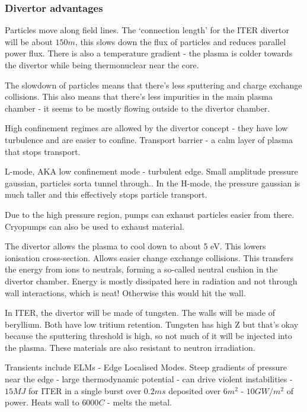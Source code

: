 \documentclass[PlasmaNotes.tex]{subfiles}
\begin{document}
\subsubsection{Divertor advantages}

Particles move along field lines. The `connection length' for the ITER divertor will be about $150m$, this slows down the flux of particles and reduces parallel power flux. There is also a temperature gradient - the plasma is colder towards the divertor while being thermonuclear near the core.

The slowdown of particles means that there's less sputtering and charge exchange collisions. This also means that there's less impurities in the main plasma chamber - it seems to be mostly flowing outside to the divertor chamber.

High confinement regimes are allowed by the divertor concept - they have low turbulence and are easier to confine. Transport barrier - a calm layer of plasma that stops transport.

L-mode, AKA low confinement mode - turbulent edge. Small amplitude pressure gaussian, particles sorta tunnel through.. In the H-mode, the pressure gaussian is much taller and this effectively stops particle transport.

Due to the high pressure region, pumps can exhaust particles easier from there. Cryopumps can also be used to exhaust material.


The divertor allows the plasma to cool down to about 5 eV. This lowers ionisation cross-section. Allows easier change exchange collisions. This transfers the energy from ions to neutrals, forming a so-called neutral cushion in the divertor chamber. Energy is mostly dissipated here in radiation and not through wall interactions, which is neat! Otherwise this would hit the wall.

In ITER, the divertor will be made of tungsten. The walls will be made of beryllium. Both have low tritium retention. Tungsten has high Z but that's okay because the sputtering threshold is high, so not much of it will be injected into the plasma. These materials are also resistant to neutron irradiation.


Transients include ELMs - Edge Localised Modes. Steep gradients of pressure near the edge - large thermodynamic potential - can drive violent instabilities - $15MJ$ for ITER in a single burst over $0.2ms$ deposited over $6m^2$ - $10GW/m^2$ of power. Heats wall to $6000 C$ - melts the metal.
\end{document}
